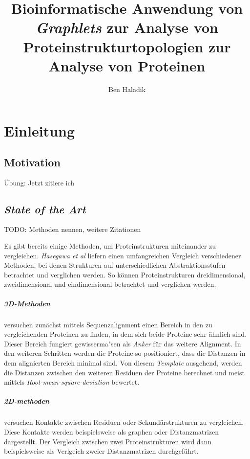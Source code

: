 \documentclass{report}
\author{Ben Haladik}
\title{Bioinformatische Anwendung von \textit{Graphlets} zur Analyse von Proteinstrukturtopologien zur Analyse von Proteinen}
\begin{document}
\maketitle

\newpage

\tableofcontents

\newpage

\chapter{Einleitung}

\section{Motivation}

\"Ubung: \cite{advancespitfalls}
Jetzt zitiere ich \cite{ptgl1}


\section{\textit{State of the Art}}

TODO: Methoden nennen, weitere Zitationen

Es gibt bereits einige Methoden, um Proteinstrukturen miteinander zu vergleichen. \textit{Hasegawa et al} \cite{advancespitfalls} liefern einen umfangreichen Vergleich verschiedener Methoden, bei denen Strukturen auf unterschiedlichen Abstraktionsstufen betrachtet und verglichen werden. So k\"onnen Proteinstrukturen dreidimensional, zweidimensional und eindimensional betrachtet und verglichen werden.

\paragraph{3D-Methoden} versuchen zun\"achst mittels Sequenzalignment einen Bereich in den zu vergleichenden Proteinen zu finden, in dem sich beide Proteine sehr \"ahnlich sind. Dieser Bereich fungiert gewisserma"sen als \emph{Anker} f\"ur das weitere Alignment. In den weiteren Schritten werden die Proteine so positioniert, dass die Distanzen in dem alignierten Bereich minimal sind. Von diesem \textit{Template} ausgehend, werden die Distanzen zwischen den weiteren Residuen der Proteine berechnet und meist mittels \textit{Root-mean-square-deviation} bewertet.

\paragraph{2D-methoden} versuchen Kontakte zwischen Residuen oder Sekund\"arstrukturen zu vergleichen. Diese Kontakte werden beispielsweise als graphen oder Distanzmatrizen dargestellt. Der Vergleich zwischen zwei Proteinstrukturen wird dann beispielsweise als Verlgeich zweier Distanzmatrizen durchgef\"uhrt.
\end{document}
